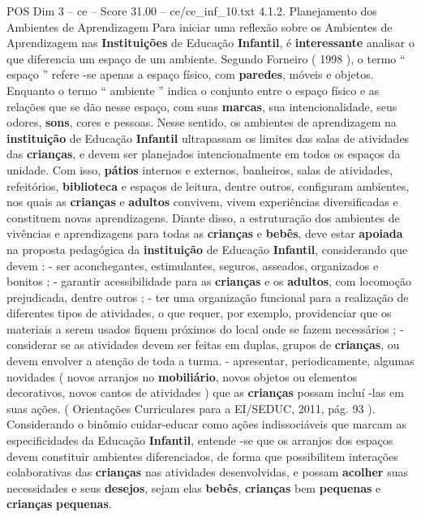 \begin{textsample}{POS Dim 3 – ce – Score 31.00 – ce/ce\_inf\_10.txt}  \label{ex:f3_pos_053}
4.1.2.
Planejamento dos Ambientes de Aprendizagem Para iniciar uma reflexão sobre os Ambientes de Aprendizagem nas \textbf{Instituições} de Educação \textbf{Infantil}, é \textbf{interessante} analisar o que diferencia um espaço de um ambiente.
Segundo Forneiro ( 1998 ), o termo “ espaço ” refere -se apenas a espaço físico, com \textbf{paredes}, móveis e objetos.
Enquanto o termo “ ambiente ” indica o conjunto entre o espaço físico e as relações que se dão nesse espaço, com suas \textbf{marcas}, sua intencionalidade, seus odores, \textbf{sons}, cores e pessoas.
Nesse sentido, os ambientes de aprendizagem na \textbf{instituição} de Educação \textbf{Infantil} ultrapassam os limites das salas de atividades das \textbf{crianças}, e devem ser planejados intencionalmente em todos os espaços da unidade.
Com isso, \textbf{pátios} internos e externos, banheiros, salas de atividades, refeitórios, \textbf{biblioteca} e espaços de leitura, dentre outros, configuram ambientes, nos quais as \textbf{crianças} e \textbf{adultos} convivem, vivem experiências diversificadas e constituem novas aprendizagens.
Diante disso, a estruturação dos ambientes de vivências e aprendizagens para todas as \textbf{crianças} e \textbf{bebês}, deve estar \textbf{apoiada} na proposta pedagógica da \textbf{instituição} de Educação \textbf{Infantil}, considerando que devem : - ser aconchegantes, estimulantes, seguros, asseados, organizados e bonitos ; - garantir acessibilidade para as \textbf{crianças} e os \textbf{adultos}, com locomoção prejudicada, dentre outros ; - ter uma organização funcional para a realização de diferentes tipos de atividades, o que requer, por exemplo, providenciar que os materiais a serem usados fiquem próximos do local onde se fazem necessários ; - considerar se as atividades devem ser feitas em duplas, grupos de \textbf{crianças}, ou devem envolver a atenção de toda a turma. - apresentar, periodicamente, algumas novidades ( novos arranjos no \textbf{mobiliário}, novos objetos ou elementos decorativos, novos cantos de atividades ) que as \textbf{crianças} possam incluí -las em suas ações. ( Orientações Curriculares para a EI/SEDUC, 2011, pág. 93 ).
Considerando o binômio cuidar-educar como ações indissociáveis que marcam as especificidades da Educação \textbf{Infantil}, entende -se que os arranjos dos espaços devem constituir ambientes diferenciados, de forma que possibilitem interações colaborativas das \textbf{crianças} nas atividades desenvolvidas, e possam \textbf{acolher} suas necessidades e seus \textbf{desejos}, sejam elas \textbf{bebês}, \textbf{crianças} bem \textbf{pequenas} e \textbf{crianças} \textbf{pequenas}.

\end{textsample}
